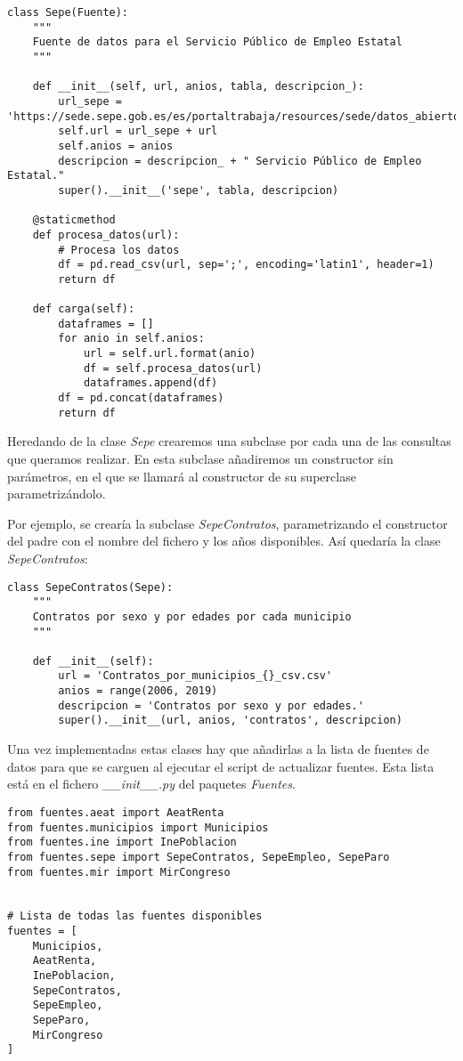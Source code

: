 \newpage

\begin{lstlisting}[caption=Ejemplo de fuente de datos (Sepe)]
class Sepe(Fuente):
	"""
	Fuente de datos para el Servicio Público de Empleo Estatal
	"""

	def __init__(self, url, anios, tabla, descripcion_):
		url_sepe = 'https://sede.sepe.gob.es/es/portaltrabaja/resources/sede/datos_abiertos/datos/'
		self.url = url_sepe + url
		self.anios = anios
		descripcion = descripcion_ + " Servicio Público de Empleo Estatal."
		super().__init__('sepe', tabla, descripcion)

    @staticmethod
	def procesa_datos(url):
		# Procesa los datos
		df = pd.read_csv(url, sep=';', encoding='latin1', header=1)
		return df

	def carga(self):
		dataframes = []
		for anio in self.anios:
			url = self.url.format(anio)
			df = self.procesa_datos(url)
			dataframes.append(df)
		df = pd.concat(dataframes)
		return df
\end{lstlisting}

Heredando de la clase \textit{Sepe} crearemos una subclase por cada una de las consultas que queramos realizar. En esta subclase añadiremos un constructor sin parámetros, en el que se llamará al constructor de su superclase parametrizándolo.

Por ejemplo, se crearía la subclase \textit{SepeContratos}, parametrizando el constructor del padre con el nombre del fichero y los años disponibles. Así quedaría la clase \textit{SepeContratos}:

\begin{lstlisting}[caption=Ejemplo de fuente de datos (SepeContratos)]
class SepeContratos(Sepe):
	"""
	Contratos por sexo y por edades por cada municipio
	"""
	
	def __init__(self):
		url = 'Contratos_por_municipios_{}_csv.csv'
		anios = range(2006, 2019)
		descripcion = 'Contratos por sexo y por edades.'
		super().__init__(url, anios, 'contratos', descripcion)
\end{lstlisting}

Una vez implementadas estas clases hay que añadirlas a la lista de fuentes de datos para que se carguen al ejecutar el script de actualizar fuentes. Esta lista está en el fichero \textit{\_\_init\_\_.py} del paquetes \textit{Fuentes}.

\begin{lstlisting}[caption=Lista con todas las fuentes]
from fuentes.aeat import AeatRenta
from fuentes.municipios import Municipios
from fuentes.ine import InePoblacion
from fuentes.sepe import SepeContratos, SepeEmpleo, SepeParo
from fuentes.mir import MirCongreso


# Lista de todas las fuentes disponibles
fuentes = [
	Municipios,
	AeatRenta,
	InePoblacion,
	SepeContratos,
	SepeEmpleo,
	SepeParo,
	MirCongreso
]
\end{lstlisting}

